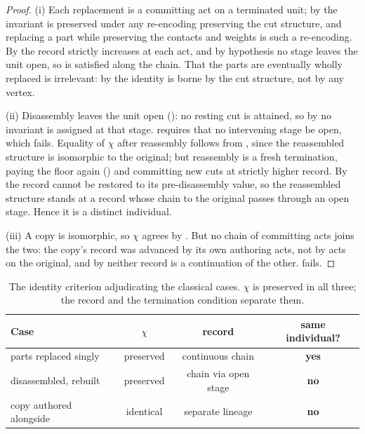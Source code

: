 \documentclass[11pt,twocolumn,a4paper]{article}
\theoremstyle{dirthm}
\theoremstyle{definition}
\theoremstyle{remark}
\newcommand{\Char}{\chi}
\begin{document}
\begin{proof}
(i) Each replacement is a committing act on a terminated unit; by
 the invariant is preserved under any re-encoding
preserving the cut structure, and replacing a part while preserving the
contacts and weights is such a re-encoding. By  the record
strictly increases at each act, and by hypothesis no stage leaves the unit
open, so  is satisfied along the chain. That the parts
are eventually wholly replaced is irrelevant: by  the
identity is borne by the cut structure, not by any vertex.

(ii) Disassembly leaves the unit open (): no resting cut
is attained, so by  no invariant is assigned at that
stage.  requires that no intervening stage be open,
which fails. Equality of $\Char$ after reassembly follows from
, since the reassembled structure is isomorphic to the
original; but reassembly is a fresh termination, paying the floor again
() and committing new cuts at strictly higher
record. By  the record cannot be restored to its
pre-disassembly value, so the reassembled structure stands at a record whose
chain to the original passes through an open stage. Hence it is a distinct
individual.

(iii) A copy is isomorphic, so $\Char$ agrees by . But no
chain of committing acts joins the two: the copy's record was advanced by its
own authoring acts, not by acts on the original, and by 
neither record is a continuation of the other.  fails.
\end{proof}

\begin{table}[t]
\centering\small
\caption{The identity criterion adjudicating the classical cases. $\Char$ is
preserved in all three; the record and the termination condition separate
them.}
\label{tab:theseus}
\begin{tabular}{@{}lccc@{}}
\toprule
\textbf{Case} & $\Char$ & \textbf{record} & \textbf{same individual?}\\
\midrule
parts replaced singly   & preserved & continuous chain & \textbf{yes}\\
disassembled, rebuilt   & preserved & chain via open stage & \textbf{no}\\
copy authored alongside & identical & separate lineage & \textbf{no}\\
\bottomrule
\end{tabular}
\end{table}
\end{document}
